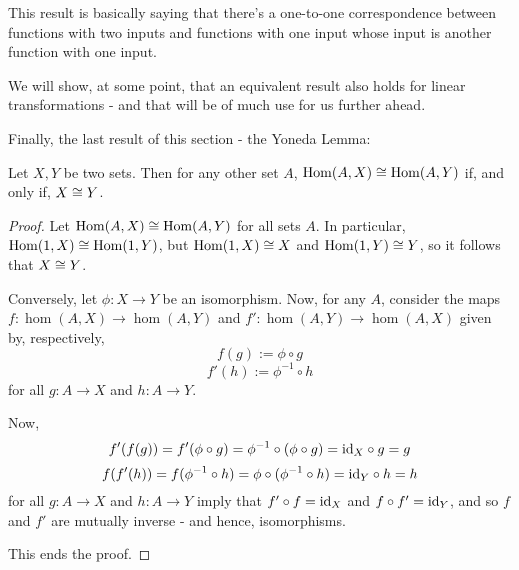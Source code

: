\begin{rmk}
	This result is basically saying that there's a one-to-one correspondence between functions with two inputs and functions with one input whose input is another function with one input.
\end{rmk}

We will show, at some point, that an equivalent result also holds for linear transformations - and that will be of much use for us further ahead.

Finally, the last result of this section - the Yoneda Lemma:

\begin{theorem}
	Let $X,Y$ be two sets. Then for any other set $A$, $\mathrm{Hom}(A,X)\cong\mathrm{Hom}(A,Y)$ if, and only if, $X\cong Y$.
\end{theorem}
\begin{proof}
	Let $\mathrm{Hom}(A,X)\cong \mathrm{Hom}(A,Y)$ for all sets $A$. In particular, $\mathrm{Hom}(1,X)\cong\mathrm{Hom}(1,Y)$, but $\mathrm{Hom}(1,X)\cong X$ and $\mathrm{Hom}(1,Y)\cong Y$, so it follows that $X\cong Y$.
	
	\bigskip
	Conversely, let $\phi:X\to Y$ be an isomorphism. Now, for any $A$, consider the maps $f:\hom(A,X)\to\hom(A,Y)$ and $f':\hom(A,Y)\to\hom(A,X)$ given by, respectively,
	\[f(g):=\phi\circ g\]
	\[f'(h):=\phi^{-1}\circ h\]for all $g:A\to X$ and $h:A\to Y$.
	
	Now,
	\[f'(f(g))=f'(\phi\circ g)=\phi^{-1}\circ( \phi\circ g)={\rm id}_X\circ g=g\]
	\[f(f'(h))=f(\phi^{-1}\circ h)=\phi\circ(\phi^{-1}\circ h)={\rm id}_Y\circ h=h\]for all $g:A\to X$ and $h:A\to Y$ imply that $f'\circ f={\rm id}_X$ and $f\circ f'={\rm id}_Y$, and so $f$ and $f'$ are mutually inverse - and hence, isomorphisms.
	
	This ends the proof.
\end{proof}